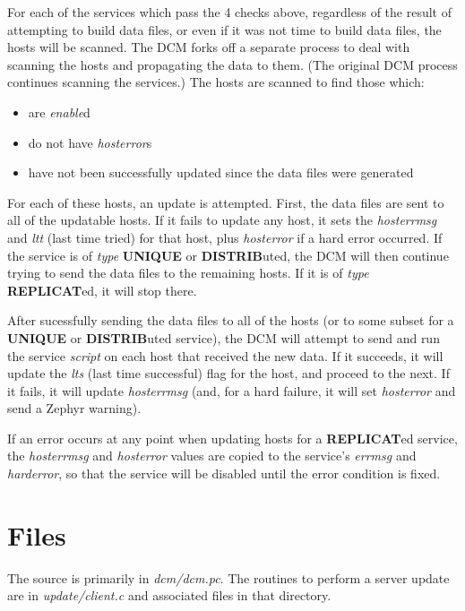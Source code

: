\documentclass{article}
\begin{document}
For each of the services which pass the 4 checks above, regardless of
the result of attempting to build data files, or even if it was not
time to build data files, the hosts will be scanned. The DCM forks off
a separate process to deal with scanning the hosts and propagating the
data to them. (The original DCM process continues scanning the
services.) The hosts are scanned to find those which:

\begin{itemize}
\item are {\it enable\/}d

\item do not have {\it hosterror\/}s

\item have not been successfully updated since the data files were generated
\end{itemize}

For each of these hosts, an update is attempted. First, the data files
are sent to all of the updatable hosts. If it fails to update any
host, it sets the {\it hosterrmsg\/} and {\it ltt\/} (last time tried)
for that host, plus {\it hosterror\/} if a hard error occurred. If the
service is of {\it type\/} {\bf UNIQUE} or {\bf DISTRIB}uted, the DCM
will then continue trying to send the data files to the remaining
hosts. If it is of {\it type\/} {\bf REPLICAT}ed, it will stop there.

After sucessfully sending the data files to all of the hosts (or to
some subset for a {\bf UNIQUE} or {\bf DISTRIB}uted service), the DCM
will attempt to send and run the service {\it script\/} on each host
that received the new data. If it succeeds, it will update the {\it
lts\/} (last time successful) flag for the host, and proceed to the
next. If it fails, it will update {\it hosterrmsg\/} (and, for a hard
failure, it will set {\it hosterror\/} and send a Zephyr warning).

If an error occurs at any point when updating hosts for a {\bf
REPLICAT}ed service, the {\it hosterrmsg\/} and {\it hosterror\/}
values are copied to the service's {\it errmsg\/} and {\it
harderror}, so that the service will be disabled until the error
condition is fixed.


\section{Files}

The source is primarily in {\it dcm/dcm.pc}. The routines to perform a
server update are in {\it update/client.c} and associated files in
that directory.
\end{document}
